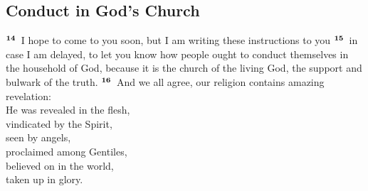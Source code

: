 \documentclass[10pt,a4paper,final, twocolumn]{article}
\renewcommand{\textsuperscript}[1]{\ensuremath{^{\textbf{\scriptsize #1}}}}
\begin{document}
\subsection*{Conduct in God’s Church}

\textsuperscript{14} I hope to come to you soon, but I am writing these instructions to you \textsuperscript{15} in case I am delayed, to let you know how people ought to conduct themselves in the household of God, because it is the church of the living God, the support and bulwark of the truth. \textsuperscript{16} And we all agree, our religion contains amazing revelation: \\
    He was revealed in the flesh, \\
    vindicated by the Spirit, \\
    seen by angels, \\
    proclaimed among Gentiles, \\
    believed on in the world, \\
    taken up in glory. 
\end{document}
